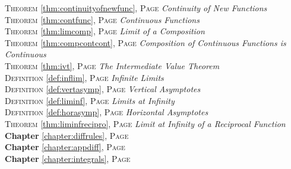 \begin{multicols}{2}
{\textsc{Theorem} \ref{thm:continuityofnewfunc}, \textsc{Page} \pageref{thm:continuityofnewfunc} \textit{Continuity of New Functions} \\
\textsc{Theorem} \ref{thm:contfunc}, \textsc{Page} \pageref{thm:contfunc} \textit{Continuous Functions} \\
\textsc{Theorem} \ref{thm:limcomp}, \textsc{Page} \pageref{thm:limcomp} \textit{Limit of a Composition} \\
\textsc{Theorem} \ref{thm:compcontcont}, \textsc{Page} \pageref{thm:compcontcont} \textit{Composition of Continuous Functions is Continuous} \\
\textsc{Theorem} \ref{thm:ivt}, \textsc{Page} \pageref{thm:ivt} \textit{The Intermediate Value Theorem} \\
\textsc{Definition} \ref{def:inflim}, \textsc{Page} \pageref{def:inflim} \textit{Infinite Limits} \\
\textsc{Definition} \ref{def:vertasymp}, \textsc{Page} \pageref{def:vertasymp} \textit{Vertical Asymptotes} \\
\textsc{Definition} \ref{def:liminf}, \textsc{Page} \pageref{def:liminf} \textit{Limits at Infinity} \\
\textsc{Definition} \ref{def:horasymp}, \textsc{Page} \pageref{def:horasymp} \textit{Horizontal Asymptotes} \\
\textsc{Theorem} \ref{thm:liminfrecipro}, \textsc{Page} \pageref{thm:liminfrecipro} \textit{Limit at Infinity of a Reciprocal Function} \\
\textbf{Chapter} \ref{chapter:diffrules}, \textsc{Page} \pageref{chapter:diffrules} \\
\textbf{Chapter} \ref{chapter:appdiff}, \textsc{Page} \pageref{chapter:appdiff} \\
\textbf{Chapter} \ref{chapter:integrals}, \textsc{Page} \pageref{chapter:integrals} \\

      }
\end{multicols}

